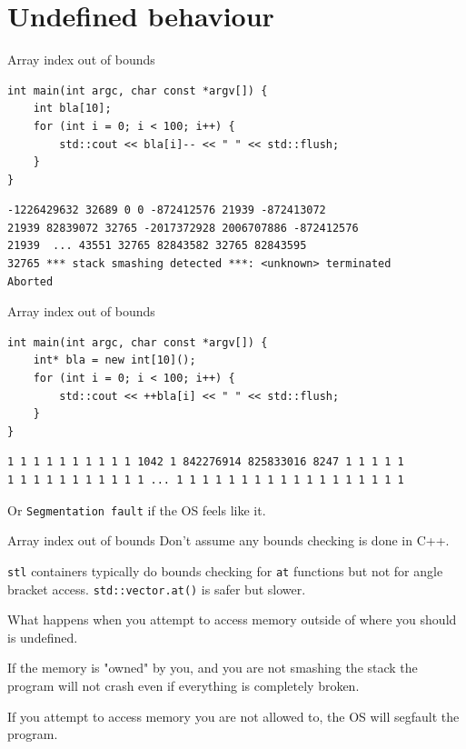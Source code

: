 \documentclass[11pt, aspectratio=169, table]{beamer}
\begin{document}
\section{Undefined behaviour}
\begin{frame}[fragile]{Array index out of bounds}
\begin{verbatim}
int main(int argc, char const *argv[]) {
    int bla[10];
    for (int i = 0; i < 100; i++) {
        std::cout << bla[i]-- << " " << std::flush;
    }
}
\end{verbatim}

\pause\begin{verbatim}
-1226429632 32689 0 0 -872412576 21939 -872413072 
21939 82839072 32765 -2017372928 2006707886 -872412576 
21939  ... 43551 32765 82843582 32765 82843595 
32765 *** stack smashing detected ***: <unknown> terminated
Aborted
\end{verbatim}
\end{frame}

\begin{frame}[fragile]{Array index out of bounds}
\begin{verbatim}
int main(int argc, char const *argv[]) {
    int* bla = new int[10]();
    for (int i = 0; i < 100; i++) {
        std::cout << ++bla[i] << " " << std::flush;
    }
}
\end{verbatim}
\pause\begin{verbatim}
1 1 1 1 1 1 1 1 1 1 1042 1 842276914 825833016 8247 1 1 1 1 1 
1 1 1 1 1 1 1 1 1 1 1 ... 1 1 1 1 1 1 1 1 1 1 1 1 1 1 1 1 1 1 
\end{verbatim}

Or \texttt{Segmentation fault} if the OS feels like it.
\end{frame}

\begin{frame}{Array index out of bounds}
\setlength\parskip{\fill}
Don't assume any bounds checking is done in C++. 

\texttt{stl} containers typically do bounds checking for \texttt{at} 
functions but not for angle bracket access. \texttt{std::vector.at()} is safer but slower.

What happens when you attempt to access memory outside of where you should is undefined.

If the memory is "owned" by you, and you are not smashing the stack the program will not crash even
if everything is completely broken.

If you attempt to access memory you are not allowed to, the OS will segfault the program.
\end{frame}
\end{document}
